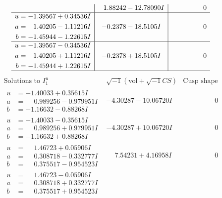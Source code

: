 \documentclass[1p]{elsarticle_modified}
\theoremstyle{definition}
\newcommand{\I}{\sqrt{-1}}
\begin{document}
$$\begin{array}{c|c|c}
 & \phantom{-}1.88242 - 12.78090 I & \phantom{-0.000000 } 0 \\ \hline\begin{aligned}
u &= -1.39567 + 0.34536 I \\
a &= \phantom{-}1.40205 - 1.11216 I \\
b &= -1.45944 - 1.22615 I\end{aligned}
 & -0.2378 - 18.5105 I & \phantom{-0.000000 } 0 \\ \hline\begin{aligned}
u &= -1.39567 - 0.34536 I \\
a &= \phantom{-}1.40205 + 1.11216 I \\
b &= -1.45944 + 1.22615 I\end{aligned}
 & -0.2378 + 18.5105 I & \phantom{-0.000000 } 0\\
 \hline 
 \end{array}$$\newpage$$\begin{array}{c|c|c}  
\text{Solutions to }I^u_{1}& \I (\text{vol} + \sqrt{-1}CS) & \text{Cusp shape}\\
 \hline 
\begin{aligned}
u &= -1.40033 + 0.35615 I \\
a &= \phantom{-}0.989256 - 0.979951 I \\
b &= -1.16632 - 0.88268 I\end{aligned}
 & -4.30287 - 10.06720 I & \phantom{-0.000000 } 0 \\ \hline\begin{aligned}
u &= -1.40033 - 0.35615 I \\
a &= \phantom{-}0.989256 + 0.979951 I \\
b &= -1.16632 + 0.88268 I\end{aligned}
 & -4.30287 + 10.06720 I & \phantom{-0.000000 } 0 \\ \hline\begin{aligned}
u &= \phantom{-}1.46723 + 0.05906 I \\
a &= \phantom{-}0.308718 - 0.332777 I \\
b &= \phantom{-}0.375517 - 0.954523 I\end{aligned}
 & \phantom{-}7.54231 + 4.16958 I & \phantom{-0.000000 } 0 \\ \hline\begin{aligned}
u &= \phantom{-}1.46723 - 0.05906 I \\
a &= \phantom{-}0.308718 + 0.332777 I \\
b &= \phantom{-}0.375517 + 0.954523 I\end{aligned}

\end{array}$$
\end{document}

